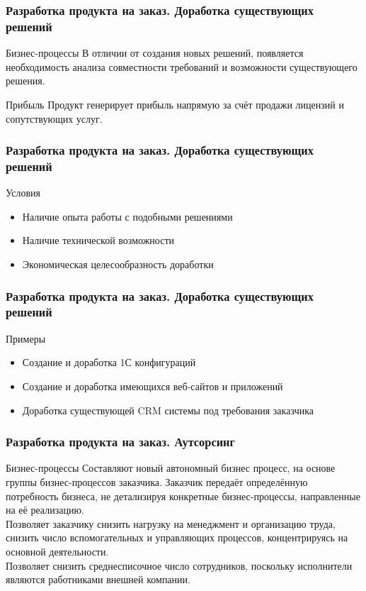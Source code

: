 \documentclass{../industrial-development}
\begin{document}
\begin{frame} \frametitle{Разработка продукта на заказ. Доработка существующих решений}
	\begin{block}{Бизнес-процессы}
		В отличии от создания новых решений, появляется необходимость анализа совместности требований и возможности существующего решения.
	\end{block}
	\begin{block}{Прибыль}
		Продукт генерирует прибыль напрямую за счёт продажи лицензий и сопутствующих услуг.
	\end{block}
\end{frame}
\lecturenotes


\begin{frame} \frametitle{Разработка продукта на заказ. Доработка существующих решений}
	\begin{block}{Условия}
		\begin{itemize}
			\item Наличие опыта работы с подобными решениями
			\item Наличие технической возможности
			\item Экономическая целесообразность доработки
		\end{itemize}
	\end{block}
\end{frame}
\lecturenotes


\begin{frame} \frametitle{Разработка продукта на заказ. Доработка существующих решений}
	\begin{block}{Примеры}
		\begin{itemize}
			\item Создание и доработка 1С конфигураций
			\item Создание и доработка имеющихся веб-сайтов и приложений
			\item Доработка существующей CRM системы под требования заказчика
		\end{itemize}
	\end{block}
\end{frame}
\lecturenotes


\begin{frame} \frametitle{Разработка продукта на заказ. Аутсорсинг}
	\begin{block}{Бизнес-процессы}
		Составляют новый автономный бизнес процесс, на основе группы бизнес-процессов заказчика. Заказчик передаёт определённую потребность бизнеса, не детализируя конкретные бизнес-процессы, направленные на её реализацию.\\
		Позволяет заказчику снизить нагрузку на менеджмент и организацию труда, снизить число вспомогательных и управляющих процессов, концентрируясь на основной деятельности.\\
		Позволяет снизить среднесписочное число сотрудников, поскольку исполнители являются работниками внешней компании.
	\end{block}
\end{frame}
\lecturenotes
\end{document}
